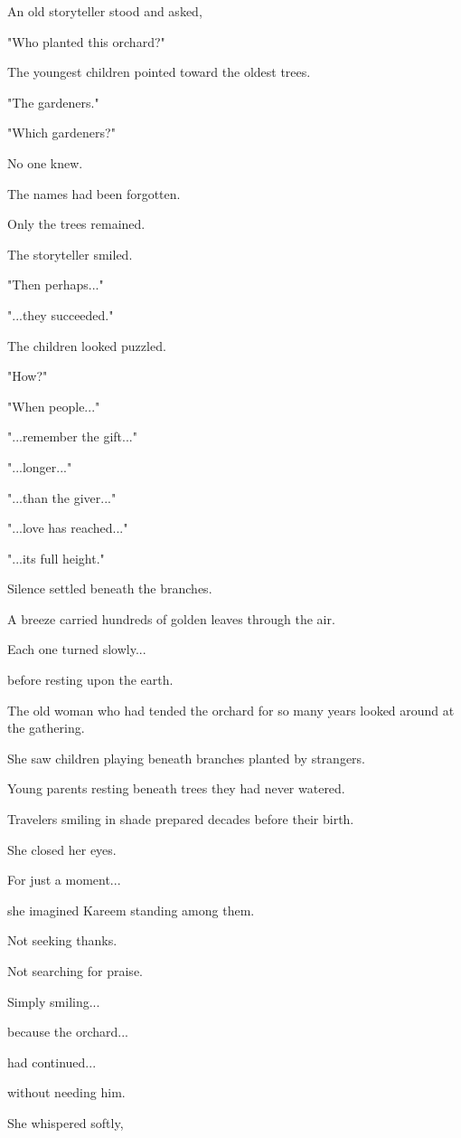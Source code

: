 \documentclass[12pt,openany]{book}
\begin{document}
An old storyteller stood and asked,

"Who planted this orchard?"

The youngest children pointed toward the oldest trees.

"The gardeners."

"Which gardeners?"

No one knew.

The names had been forgotten.

Only the trees remained.

The storyteller smiled.

"Then perhaps..."

"...they succeeded."

The children looked puzzled.

"How?"

"When people..."

"...remember the gift..."

"...longer..."

"...than the giver..."

"...love has reached..."

"...its full height."

Silence settled beneath the branches.

A breeze carried hundreds of golden leaves through the air.

Each one turned slowly...

before resting upon the earth.

The old woman who had tended the orchard for so many years looked around at the gathering.

She saw children playing beneath branches planted by strangers.

Young parents resting beneath trees they had never watered.

Travelers smiling in shade prepared decades before their birth.

She closed her eyes.

For just a moment...

she imagined Kareem standing among them.

Not seeking thanks.

Not searching for praise.

Simply smiling...

because the orchard...

had continued...

without needing him.

She whispered softly,
\end{document}
